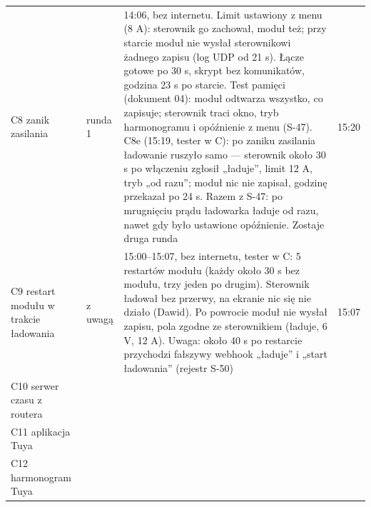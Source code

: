 \documentclass[11pt,a4paper]{article}
\begin{document}
\begin{longtable}{>{\raggedright\arraybackslash}p{3.11cm}>{\raggedright\arraybackslash}p{2.00cm}>{\raggedright\arraybackslash}p{8.57cm}>{\raggedright\arraybackslash}p{1.16cm}}
C8 zanik zasilania & \leavevmode{\symbolfont\color{apamber}\textbf{◐}} runda 1 & 30.09 14:06, bez internetu. Limit ustawiony z menu (8 A): sterownik go zachował, moduł też; przy starcie moduł nie wysłał sterownikowi żadnego zapisu (log UDP od 21 s). Łącze gotowe po 30 s, skrypt bez komunikatów, godzina 23 s po starcie. Test pamięci (dokument 04): moduł odtwarza wszystko, co zapisuje; sterownik traci okno, tryb harmonogramu i opóźnienie z menu (S-47). C8e \leavevmode{\symbolfont\color{apgreen}\textbf{✔}} (15:19, tester w C): po zaniku zasilania ładowanie ruszyło samo — sterownik około 30 s po włączeniu zgłosił „ładuje”, limit 12 A, tryb „od razu”; moduł nic nie zapisał, godzinę przekazał po 24 s. Razem z S-47: po mrugnięciu prądu ładowarka ładuje od razu, nawet gdy było ustawione opóźnienie. Zostaje druga runda & 30.09 15:20 \\
C9 restart modułu w trakcie ładowania & \leavevmode{\symbolfont\color{apgreen}\textbf{✔}} z uwagą & 30.09 15:00–15:07, bez internetu, tester w C: 5 restartów modułu (każdy około 30 s bez modułu, trzy jeden po drugim). Sterownik ładował bez przerwy, na ekranie nic się nie działo (Dawid). Po powrocie moduł nie wysłał zapisu, pola zgodne ze sterownikiem (ładuje, 6 V, 12 A). Uwaga: około 40 s po restarcie przychodzi fałszywy webhook „ładuje” i „start ładowania” (rejestr S-50) & 30.09 15:07 \\
C10 serwer czasu z routera &  &  &  \\
C11 aplikacja Tuya &  &  &  \\
C12 harmonogram Tuya &  &  &  \\
\end{longtable}
\end{document}
